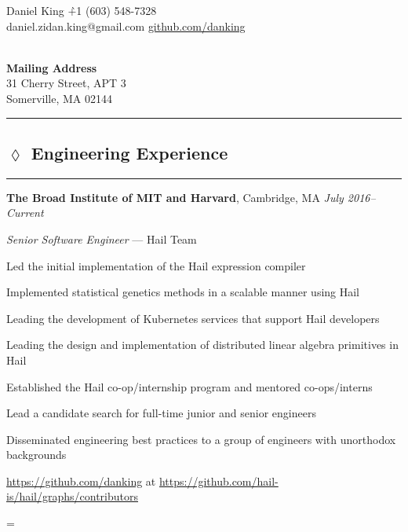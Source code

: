 \documentclass[10pt]{article}
\newenvironment{absolutelynopagebreak}
  {\par\nobreak\vfil\penalty0\vfilneg
   \vtop\bgroup}
  {\par\xdef\tpd{\the\prevdepth}\egroup
   \prevdepth=\tpd}
\newenvironment{my-itemize}
  {\begin{itemize*}
   \renewcommand{\labelitemi}{$\angle$}
  }
  {\end{itemize*}}
\newcommand{\job}[6]{
  \begin{absolutelynopagebreak}
  \vspace{-5pt}
  \begin{tabbing} {\bf #1}, #2 \` {\small \textit{#3}} \end{tabbing}
  \vspace{-12pt}
  \begin{my-itemize}
  \setlength\itemsep{1pt}
  \item [] {\textit{#4} \ifthenelse{\equal{#5}{}}
                                   {}
                                   {--- #5}}
  #6
  \end{my-itemize}%
  \end{absolutelynopagebreak}
  \vspace{-18pt}
}
\newcommand{\heading}[2]{
  \vspace{1.5em}
  \subsection*{\hspace{-.9em}$\lozenge$ #1}
  \vspace{-12pt}
  \rule{2in}{.5pt}
  \vspace{-1em}
  #2
}
\begin{document}
\begin{tabbing}{\Huge Daniel King} \`+1 (603) 548-7328\\
\normalsize daniel.zidan.king@gmail.com \`\url{github.com/danking}
\end{tabbing}

\vspace{-15pt}

\begin{tabbing}
                                        \`\\
\textbf{Mailing Address}                \`\\
31 Cherry Street, APT 3                 \`\\
Somerville, MA 02144                    \`\\
\end{tabbing}
\vspace{-25pt}
\rule{\linewidth}{.1pt}

\vspace{-2em}
\heading{Engineering Experience}

\job{The Broad Institute of MIT and Harvard}
    {Cambridge, MA}
    {July 2016--Current}
    {Senior Software Engineer}
    {Hail Team}{

    \item{Led the initial implementation of the Hail expression compiler}

    \item{Implemented statistical genetics methods in a scalable manner using
      Hail}

    \item{Leading the development of Kubernetes services that support Hail
      developers}

    \item{Leading the design and implementation of distributed linear algebra
      primitives in Hail}

    \item{Established the Hail co-op/internship program and mentored
      co-ops/interns}

    \item{Lead a candidate search for full-time junior and senior engineers}

    \item{Disseminated engineering best practices to a group of engineers
      with unorthodox backgrounds}

    \item{\url{https://github.com/danking} at \url{https://github.com/hail-is/hail/graphs/contributors}}
}
\end{document}
